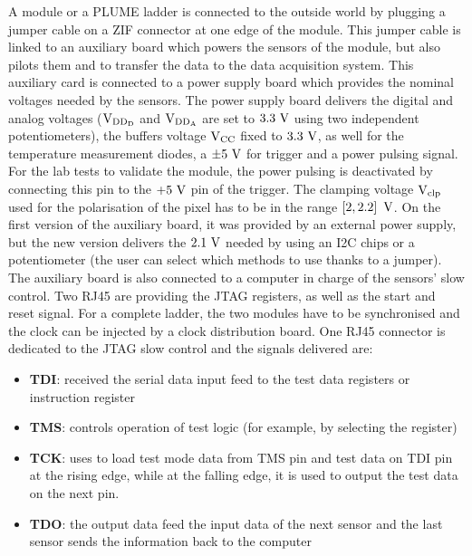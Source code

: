   A module or a PLUME ladder is connected to the outside world by plugging a jumper cable on a \gls{ZIF} connector at one edge of the module.
  This jumper cable is linked to an auxiliary board which powers the sensors of the module, but also pilots them and to transfer the data to the data acquisition system.
  This auxiliary card is connected to a power supply board which provides the nominal voltages needed by the sensors.
  The power supply board delivers the digital and analog voltages ($\rm{V}_{\rm{DD_D}}$ and $\rm{V}_{\rm{DD_A}}$ are set to $3.3~\rm{V}$ using two independent potentiometers), the buffers voltage $\rm{V}_{\rm{CC}}$ fixed to $3.3~\rm{V}$, as well for the temperature measurement diodes, a $\pm 5~\rm{V}$ for trigger and a power pulsing signal.
  For the lab tests to validate the module, the power pulsing is deactivated by connecting this pin to the $+5~\rm{V}$ pin of the trigger.
  The clamping voltage $\rm{V}_{\rm{clp}}$ used for the polarisation of the pixel has to be in the range $\left[2, 2.2\right]~\rm{V}$.
  On the first version of the auxiliary board, it was provided by an external power supply, but the new version delivers the $2.1~\rm{V}$ needed by using an \gls{I2C} chips or a potentiometer (the user can select which methods to use thanks to a jumper).
  The auxiliary board is also connected to a computer in charge of the sensors' slow control.
  Two RJ45 are providing the \gls{JTAG} registers, as well as the start and reset signal. 
  For a complete ladder, the two modules have to be synchronised and the clock can be injected by a clock distribution board.
  One RJ45 connector is dedicated to the \gls{JTAG} slow control and the signals delivered are: 

  \begin{itemize}
    \item \textbf{\gls{TDI}}: received the serial data input feed to the test data registers or instruction register
    \item \textbf{\gls{TMS}}: controls operation of test logic (for example, by selecting the register)
    \item \textbf{\gls{TCK}}: uses to load test mode data from \gls{TMS} pin and test data on \gls{TDI} pin at the rising edge, while at the falling edge, it is used to output the test data on the next pin.
    \item \textbf{\gls{TDO}}: the output data feed the input data of the next sensor and the last sensor sends the information back to the computer 
  \end{itemize}

